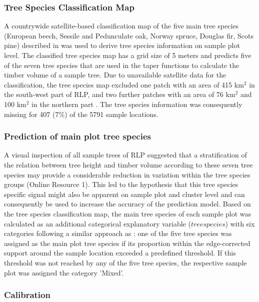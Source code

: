 \subsubsection{Tree Species Classification Map}
\label{sec:tspecclass}

A countrywide satellite-based classification map of the five main tree species (European beech, Sessile and Pedunculate oak, Norway spruce, Douglas fir, Scots pine) described in \citet{stoffels2015} was used to derive tree species information on sample plot level. The classified tree species map has a grid size of 5 meters and predicts five of the seven tree species that are used in the \bwi{} taper functions \citep{kublin2013} to calculate the timber volume of a sample tree. Due to unavailable satellite data for the classification, the tree species map excluded one patch with an area of 415 km$^2$ in the south-west part of RLP, and two further patches with an area of 76 km$^2$ and 100 km$^2$ in the northern part \citep{stoffels2015}. The tree species information was consequently missing for 407 (7\%) of the 5791 sample locations.

\subsubsection*{Prediction of main plot tree species}

A visual inspection of all \bwi{} sample trees of RLP suggested that a stratification of the relation between tree height and timber volume according to these seven tree species may provide a considerable reduction in variation within the tree species groups (Online Resource 1). This led to the hypothesis that this tree species specific signal might also be apparent on sample plot and cluster level and can consequently be used to increase the accuracy of the prediction model. Based on the tree species classification map, the main tree species of each sample plot was calculated as an additional categorical explanatory variable ($treespecies$) with six categories following a similar approach as \citet{latifi2012}: one of the five tree species was assigned as the main plot tree species if its proportion within the edge-corrected support around the sample location exceeded a predefined threshold. If this threshold was not reached by any of the five tree species, the respective sample plot was assigned the category 'Mixed'.\par


\subsubsection*{Calibration}

